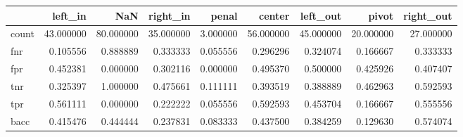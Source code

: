 \begin{tabular}{lrrrrrrrr}
\toprule
{} &    left\_in &        NaN &   right\_in &     penal &     center &   left\_out &      pivot &  right\_out \\
\midrule
count &  43.000000 &  80.000000 &  35.000000 &  3.000000 &  56.000000 &  45.000000 &  20.000000 &  27.000000 \\
fnr   &   0.105556 &   0.888889 &   0.333333 &  0.055556 &   0.296296 &   0.324074 &   0.166667 &   0.333333 \\
fpr   &   0.452381 &   0.000000 &   0.302116 &  0.000000 &   0.495370 &   0.500000 &   0.425926 &   0.407407 \\
tnr   &   0.325397 &   1.000000 &   0.475661 &  0.111111 &   0.393519 &   0.388889 &   0.462963 &   0.592593 \\
tpr   &   0.561111 &   0.000000 &   0.222222 &  0.055556 &   0.592593 &   0.453704 &   0.166667 &   0.555556 \\
bacc  &   0.415476 &   0.444444 &   0.237831 &  0.083333 &   0.437500 &   0.384259 &   0.129630 &   0.574074 \\
\bottomrule
\end{tabular}
